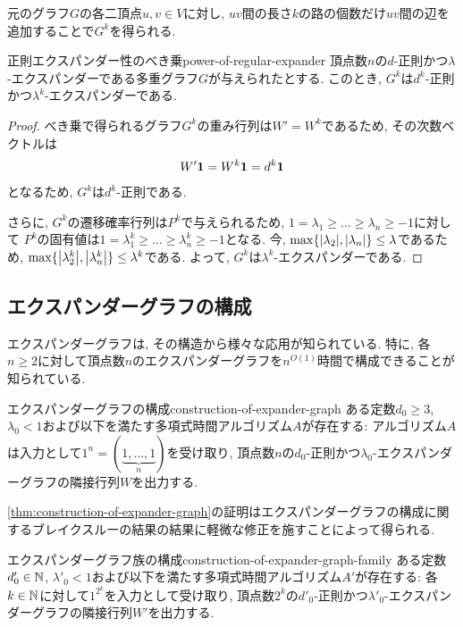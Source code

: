 元のグラフ$G$の各二頂点$u,v\in V$に対し,
$uv$間の長さ$k$の路の個数だけ$uv$間の辺を追加することで$G^k$を得られる.

\begin{lemma}{正則エクスパンダー性のべき乗}{power-of-regular-expander}
  頂点数$n$の$d$-正則かつ$\lambda$-エクスパンダーである多重グラフ$G$が与えられたとする.
  このとき, $G^k$は$d^k$-正則かつ$\lambda^k$-エクスパンダーである.
\end{lemma}

\begin{proof}
  べき乗で得られるグラフ$G^k$の重み行列は$W'=W^k$であるため, その次数ベクトルは
  \begin{align*}
    W'\mathbf{1} = W^k\mathbf{1} = d^k\mathbf{1}
  \end{align*}
  となるため, $G^k$は$d^k$-正則である.

  さらに, $G^k$の遷移確率行列は$P^k$で与えられるため, $1=\lambda_1 \ge \dots \ge \lambda_n \ge -1$に対して
  $P^k$の固有値は$1=\lambda_1^k \ge \dots \ge \lambda_n^k \ge -1$となる.
  今, $\max\{\abs{\lambda_2}, \abs{\lambda_n}\} \le \lambda$であるため, $\max\{\abs{\lambda_2^k}, \abs{\lambda_n^k}\} \le \lambda^k$である.
  よって, $G^k$は$\lambda^k$-エクスパンダーである.
\end{proof}

\subsection{エクスパンダーグラフの構成}

エクスパンダーグラフは, その構造から様々な応用が知られている.
特に, 各$n\ge 2$に対して頂点数$n$のエクスパンダーグラフを$n^{O(1)}$時間で構成できることが知られている.

\begin{theorem}{エクスパンダーグラフの構成}{construction-of-expander-graph}
  ある定数$d_0\ge 3$, $\lambda_0<1$および以下を満たす多項式時間アルゴリズム$A$が存在する:
  アルゴリズム$A$は入力として$1^n=(\underbrace{1,\dots,1}_n)$を受け取り, 頂点数$n$の$d_0$-正則かつ$\lambda_0$-エクスパンダーグラフの隣接行列$W$を出力する.
\end{theorem}

\cref{thm:construction-of-expander-graph}の証明はエクスパンダーグラフの構成に関するブレイクスルーの結果\cite{ReingoldVW02}の結果に軽微な修正を施すことによって得られる.

\begin{theorem}{エクスパンダーグラフ族の構成}{construction-of-expander-graph-family}
  ある定数$d'_0\in\mathbb{N}$, $\lambda'_0<1$および以下を満たす多項式時間アルゴリズム$A'$が存在する:
  各$k\in \mathbb{N}$に対して$1^{2^k}$を入力として受け取り, 頂点数$2^k$の$d'_0$-正則かつ$\lambda'_0$-エクスパンダーグラフの隣接行列$W'$を出力する.
\end{theorem}

